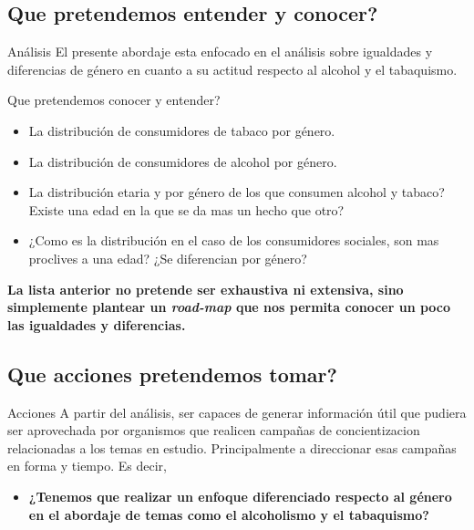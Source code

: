 \documentclass[8pt]{beamer}
\begin{document}
\subsection{Que pretendemos entender y conocer?}
\begin{frame}

\begin{block}{Análisis}
El presente abordaje esta enfocado en el análisis sobre igualdades y diferencias de género en cuanto a su
actitud respecto al alcohol y el tabaquismo.
\end{block}
\pause
\begin{block}{Que pretendemos conocer y entender?}
\begin{itemize}
\item La distribución de consumidores de tabaco por género.
\item La distribución de consumidores de alcohol por género.
\item La distribución etaria y por género de los que consumen alcohol y tabaco? Existe una edad en la que se da mas un hecho que otro?
\item ¿Como es la distribución en el caso de los consumidores sociales, son mas proclives a una edad? ¿Se diferencian por género?
\end{itemize}
\end{block}
\pause
\textbf{La lista anterior no pretende ser exhaustiva ni extensiva, sino simplemente plantear un \textit{road-map} que nos permita conocer 
un poco las igualdades y diferencias.}

\end{frame}

\subsection{Que acciones pretendemos tomar?}
\begin{frame}
\begin{alertblock}{Acciones}
A partir del análisis, ser capaces de generar información útil que pudiera ser aprovechada por organismos
que realicen campa\~nas de concientizacion relacionadas a los temas en estudio. Principalmente a direccionar 
esas campañas en forma y tiempo. Es decir, 
\pause
\begin{itemize}
\item \textbf{¿Tenemos que realizar un enfoque diferenciado respecto al género en el abordaje de temas como el alcoholismo y el tabaquismo?}
\end{itemize}
\end{alertblock}

\end{frame}
\end{document}

